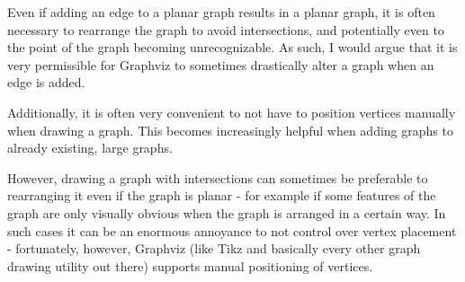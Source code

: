 Even if adding an edge to a planar graph results in a planar graph, it is often
necessary to rearrange the graph to avoid intersections, and potentially even to
the point of the graph becoming unrecognizable. As such, I would argue that it
is very permissible for Graphviz to sometimes drastically alter a graph when an
edge is added.

\medskip

Additionally, it is often very convenient to not have to position vertices
manually when drawing a graph. This becomes increasingly helpful when adding
graphs to already existing, large graphs.

\medskip

However, drawing a graph with intersections can sometimes be preferable to
rearranging it even if the graph is planar - for example if some features of the
graph are only visually obvious when the graph is arranged in a certain way. In
such cases it can be an enormous annoyance to not control over vertex placement
- fortunately, however, Graphviz (like Tikz and basically every other graph
drawing utility out there) supports manual positioning of vertices.

\Sectend
